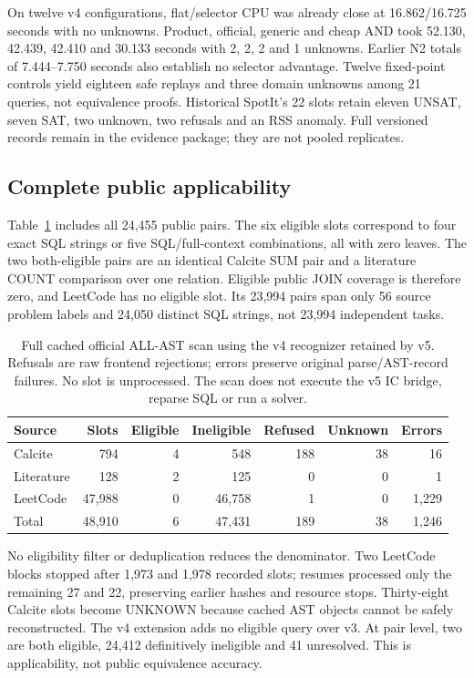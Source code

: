 On twelve v4 configurations, flat/selector CPU was already close at 16.862/16.725 seconds with no unknowns. Product, official, generic and cheap AND took 52.130, 42.439, 42.410 and 30.133 seconds with 2, 2, 2 and 1 unknowns. Earlier N2 totals of 7.444--7.750 seconds also establish no selector advantage. Twelve fixed-point controls yield eighteen safe replays and three domain unknowns among 21 queries, not equivalence proofs. Historical SpotIt's 22 slots retain eleven UNSAT, seven SAT, two unknown, two refusals and an RSS anomaly. Full versioned records remain in the evidence package; they are not pooled replicates.

\subsection{Complete public applicability}
Table~\ref{tab:versionedcoverage} includes all 24,455 public pairs. The six eligible slots correspond to four exact SQL strings or five SQL/full-context combinations, all with zero leaves. The two both-eligible pairs are an identical Calcite SUM pair and a literature COUNT comparison over one relation. Eligible public JOIN coverage is therefore zero, and LeetCode has no eligible slot. Its 23,994 pairs span only 56 source problem labels and 24,050 distinct SQL strings, not 23,994 independent tasks.

\begin{table}[htbp]
\centering
\begin{tabular}{@{}lrrrrrr@{}}
\toprule
Source & Slots & Eligible & Ineligible & Refused & Unknown & Errors\\
\midrule
Calcite & 794 & 4 & 548 & 188 & 38 & 16\\
Literature & 128 & 2 & 125 & 0 & 0 & 1\\
LeetCode & 47,988 & 0 & 46,758 & 1 & 0 & 1,229\\
\midrule
Total & 48,910 & 6 & 47,431 & 189 & 38 & 1,246\\
\bottomrule
\end{tabular}
\caption{Full cached official ALL-AST scan using the v4 recognizer retained by v5. Refusals are raw frontend rejections; errors preserve original parse/AST-record failures. No slot is unprocessed. The scan does not execute the v5 IC bridge, reparse SQL or run a solver.}\label{tab:versionedcoverage}
\end{table}

No eligibility filter or deduplication reduces the denominator. Two LeetCode blocks stopped after 1,973 and 1,978 recorded slots; resumes processed only the remaining 27 and 22, preserving earlier hashes and resource stops. Thirty-eight Calcite slots become UNKNOWN because cached AST objects cannot be safely reconstructed. The v4 extension adds no eligible query over v3. At pair level, two are both eligible, 24,412 definitively ineligible and 41 unresolved. This is applicability, not public equivalence accuracy.

